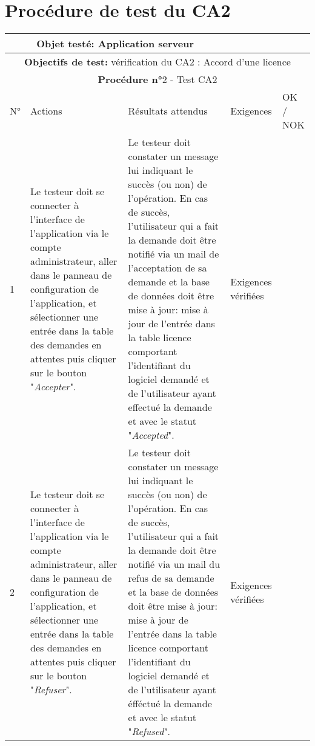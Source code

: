 \section{Procédure de test du CA2}
\begin{table}[!h]
        \centering
        \begin{tabular}{|m{0.6cm}|
                         >{\raggedright\arraybackslash}m{4cm}|
                         >{\raggedright\arraybackslash}m{6.4cm}|
                         >{\raggedright\arraybackslash}m{2cm}|
                         m{1cm}|}
            \hline
            \multicolumn{3}{|c|}{
                \textbf{Objet testé: } Application serveur
            } & \multicolumn{2}{|c|}{
                \textbf{Version: } version
            } \\
            \hline
            \multicolumn{5}{|c|}{\textbf{Objectifs de test:} 
                vérification du CA2 : Accord d'une licence }\\
            \hline
            \multicolumn{5}{|c|}{
                \textbf{Procédure n°}2 - Test CA2
            } \\
            \hline
            N° & Actions & Résultats attendus & Exigences & OK / NOK \\
            \hline      %
            1 & Le testeur doit se connecter à l'interface de l'application
                via le compte administrateur, aller dans le panneau de configuration
                de l'application, et sélectionner une entrée dans la table des demandes 
                en attentes puis cliquer sur le bouton "\emph{Accepter}". 
              & Le testeur doit constater un message lui indiquant le succès (ou non)
                de l'opération. En cas de succès, l'utilisateur qui a fait la demande 
                doit être notifié via un mail de l'acceptation de sa demande et la 
                base de données doit être mise à jour: mise à jour de l'entrée dans 
                la table licence comportant l'identifiant du logiciel demandé et de l'utilisateur 
                ayant effectué la demande et avec le statut "\emph{Accepted}".
              & Exigences vérifiées & \\
            \hline
            2 & Le testeur doit se connecter à l'interface de l'application
                via le compte administrateur, aller dans le panneau de configuration
                de l'application, et sélectionner une entrée dans la table des demandes 
                en attentes puis cliquer sur le bouton "\emph{Refuser}". 
              & Le testeur doit constater un message lui indiquant le succès (ou non)
                de l'opération. En cas de succès, l'utilisateur qui a fait la demande 
                doit être notifié via un mail du refus de sa demande et la 
                base de données doit être mise à jour: mise à jour de l'entrée dans 
                la table licence comportant l'identifiant du logiciel demandé et de l'utilisateur 
                ayant éfféctué la demande et avec le statut "\emph{Refused}".
              & Exigences vérifiées & \\
            \hline
        \end{tabular} 
        \label{tab:tab2}
\end{table}
